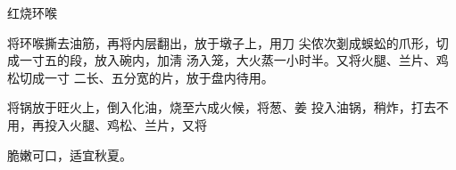\begin{recipe}{红烧环喉}

\ingredients


\cooking

\step 将环喉撕去油筋，再将内层翻出，放于墩子上，用刀 尖侬次剗成蜈蚣的爪形，切成一寸五的段，放入碗内，加淸 汤入笼，大火蒸一小时半。又将火腿、兰片、鸡松切成一寸 二长、五分宽的片，放于盘内待用。

\step 将锅放于旺火上，倒入化油，烧至六成火候，将葱、姜 投入油锅，稍炸，打去不用，再投入火腿、鸡松、兰片，又将

\notes

脆嫩可口，适宜秋夏。

\end{recipe}

